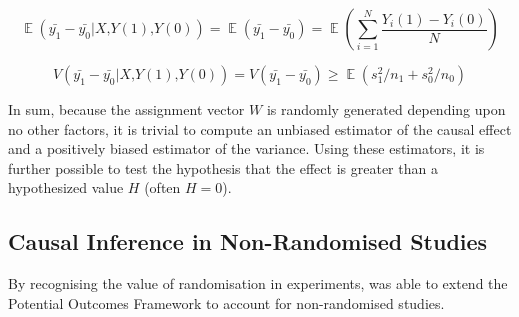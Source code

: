 \documentclass[12pt]{article}
\DeclareMathOperator{\E}{\mathbb{E}}
\newcommand{\mc}{\textrm{,}}
\DeclareMathOperator{\E}{\mathbb{E}}
\newcommand{\mc}{\textrm{,}}
\begin{document}
\begin{equation}\label{eq:RandomisedExpectation}
  \E(\bar{y_1} - \bar{y_0} | X \mc Y(1) \mc Y(0)) = \E(\bar{y_1} - \bar{y_0}) = \E(\sum^N_{i=1} \frac{Y_i(1) - Y_i(0)}{N})
\end{equation}

\begin{equation}\label{eq:RandomisedVariance}
  V(\bar{y_1} - \bar{y_0} | X \mc Y(1) \mc Y(0)) = V(\bar{y_1} - \bar{y_0}) \geq \E(s_1^2/n_1 + s_0^2/n_0)
\end{equation}

In sum, because the assignment vector $W$ is randomly generated depending upon no other factors, it is trivial to compute an unbiased estimator of the causal effect and a positively biased estimator of the variance. Using these estimators, it is further possible to test the hypothesis that the effect is greater than a hypothesized value $H$ (often $H=0$).

\subsection{Causal Inference in Non-Randomised Studies}

By recognising the value of randomisation in experiments, \citet{rubinEstimatingCausalEffects1974} was able to extend the Potential Outcomes Framework to account for non-randomised studies.
\end{document}
